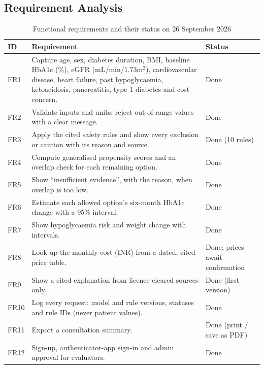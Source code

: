 \subsection{Requirement Analysis}
\begin{longtable}{p{1.1cm}p{9.6cm}>{\raggedright\arraybackslash}p{3.3cm}}
\caption{Functional requirements and their status on 26 September 2026}\label{tab:fr}\\\toprule
ID & Requirement & Status\\\midrule\endhead
FR1 & Capture age, sex, diabetes duration, BMI, baseline HbA1c (\%), eGFR (mL/min/1.73m$^2$), cardiovascular disease, heart failure, past hypoglycaemia, ketoacidosis, pancreatitis, type 1 diabetes and cost concern. & Done\\
FR2 & Validate inputs and units; reject out-of-range values with a clear message. & Done\\
FR3 & Apply the cited safety rules and show every exclusion or caution with its reason and source. & Done (10 rules)\\
FR4 & Compute generalised propensity scores and an overlap check for each remaining option. & Done\\
FR5 & Show ``insufficient evidence'', with the reason, when overlap is too low. & Done\\
FR6 & Estimate each allowed option's six-month HbA1c change with a 95\% interval. & Done\\
FR7 & Show hypoglycaemia risk and weight change with intervals. & Done\\
FR8 & Look up the monthly cost (INR) from a dated, cited price table. & Done; prices await confirmation\\
FR9 & Show a cited explanation from licence-cleared sources only. & Done (first version)\\
FR10 & Log every request: model and rule versions, statuses and rule IDs (never patient values). & Done\\
FR11 & Export a consultation summary. & Done (print / save as PDF)\\
FR12 & Sign-up, authenticator-app sign-in and admin approval for evaluators. & Done\\\bottomrule
\end{longtable}

